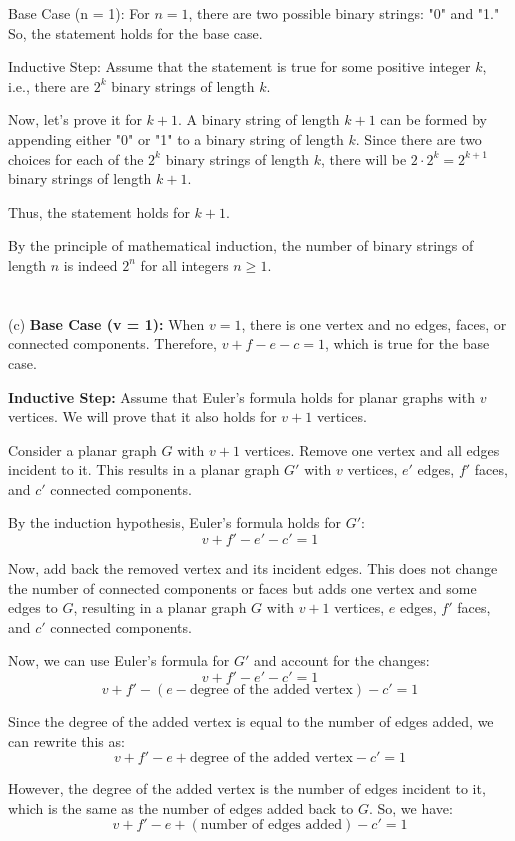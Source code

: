 \documentclass[11pt]{exam}
\begin{document}
\begin{enumerate}
\begin{solution}
Base Case (n = 1):
For $n = 1$, there are two possible binary strings: "0" and "1." So, the statement holds for the base case.

Inductive Step:
Assume that the statement is true for some positive integer $k$, i.e., there are $2^k$ binary strings of length $k$.

Now, let's prove it for $k + 1$. A binary string of length $k + 1$ can be formed by appending either "0" or "1" to a binary string of length $k$. Since there are two choices for each of the $2^k$ binary strings of length $k$, there will be $2 \cdot 2^k = 2^{k+1}$ binary strings of length $k + 1$.

Thus, the statement holds for $k + 1$.

By the principle of mathematical induction, the number of binary strings of length $n$ is indeed $2^n$ for all integers $n \geq 1$.
\\
\\
\\ (c)
\textbf{Base Case (v = 1):}
When \(v = 1\), there is one vertex and no edges, faces, or connected components. Therefore, \(v + f - e - c = 1\), which is true for the base case.

\textbf{Inductive Step:}
Assume that Euler's formula holds for planar graphs with \(v\) vertices. We will prove that it also holds for \(v + 1\) vertices.

Consider a planar graph \(G\) with \(v + 1\) vertices. Remove one vertex and all edges incident to it. This results in a planar graph \(G'\) with \(v\) vertices, \(e'\) edges, \(f'\) faces, and \(c'\) connected components.

By the induction hypothesis, Euler's formula holds for \(G'\):
\[v + f' - e' - c' = 1\]

Now, add back the removed vertex and its incident edges. This does not change the number of connected components or faces but adds one vertex and some edges to \(G\), resulting in a planar graph \(G\) with \(v + 1\) vertices, \(e\) edges, \(f'\) faces, and \(c'\) connected components.

Now, we can use Euler's formula for \(G'\) and account for the changes:
\[v + f' - e' - c' = 1\]
\[v + f' - (e - \text{degree of the added vertex}) - c' = 1\]

Since the degree of the added vertex is equal to the number of edges added, we can rewrite this as:
\[v + f' - e + \text{degree of the added vertex} - c' = 1\]

However, the degree of the added vertex is the number of edges incident to it, which is the same as the number of edges added back to \(G\). So, we have:
\[v + f' - e + (\text{number of edges added}) - c' = 1\]


\end{solution}
\end{enumerate}
\end{document}

